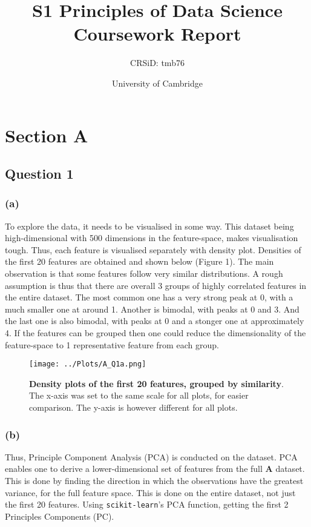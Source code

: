 \documentclass[12pt]{report} %
\title{S1 Principles of Data Science Coursework Report}
\author{CRSiD: tmb76}
\date{University of Cambridge}
\begin{document}
 

\maketitle

\chapter*{Section A}

\section*{Question 1}

\subsection*{(a)}

To explore the data, it needs to be visualised in some way. This dataset being high-dimensional with 500 dimensions in the feature-space, makes visualisation tough. Thus, each feature is visualised separately with density plot. Densities of the first 20 features are obtained and shown below (Figure 1). The main observation is that some features follow very similar distributions. A rough assumption is thus that there are overall 3 groups of highly correlated features in the entire dataset. The most common one has a very strong peak at 0, with a much smaller one at around 1. Another is bimodal, with peaks at 0 and 3. And the last one is also bimodal, with peaks at 0 and a stonger one at approximately 4. If the features can be grouped then one could reduce the dimensionality of the feature-space to 1 representative feature from each group.

\begin{figure}[hp]
    \centering
    \texttt{[image: ../Plots/A\_Q1a.png]}
    \caption{ \textbf{Density plots of the first 20 features, grouped by similarity}. The x-axis was set to the same scale for all plots, for easier comparison. The y-axis is however different for all plots.}
\end{figure}

\newpage

\subsection*{(b)}

Thus, Principle Component Analysis (PCA) is conducted on the dataset. PCA enables one to derive a lower-dimensional set of features from the full \textbf{A} dataset. This is done by finding the direction in which the observations have the greatest variance, for the full feature space\cite[pp. 255-257]{james2013introduction}. This is done on the entire dataset, not just the first 20 features. Using \texttt{scikit-learn}'s PCA function, getting the first 2 Principles Components (PC). 
\end{document}
